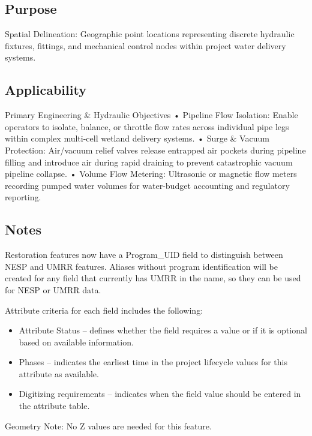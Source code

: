 \documentclass[
  letterpaper,
  DIV=11,
  numbers=noendperiod]{scrreprt}
\providecommand{\tightlist}{%
  \setlength{\itemsep}{0pt}\setlength{\parskip}{0pt}}
\begin{document}
\subsection{Purpose}\label{purpose-28}

Spatial Delineation: Geographic point locations representing discrete
hydraulic fixtures, fittings, and mechanical control nodes within
project water delivery systems.

\subsection{Applicability}\label{applicability-25}

Primary Engineering \& Hydraulic Objectives • Pipeline Flow Isolation:
Enable operators to isolate, balance, or throttle flow rates across
individual pipe legs within complex multi-cell wetland delivery systems.
• Surge \& Vacuum Protection: Air/vacuum relief valves release entrapped
air pockets during pipeline filling and introduce air during rapid
draining to prevent catastrophic vacuum pipeline collapse. • Volume Flow
Metering: Ultrasonic or magnetic flow meters recording pumped water
volumes for water-budget accounting and regulatory reporting.

\subsection{Notes}\label{notes-28}

Restoration features now have a Program\_UID field to distinguish
between NESP and UMRR features. Aliases without program identification
will be created for any field that currently has UMRR in the name, so
they can be used for NESP or UMRR data.

Attribute criteria for each field includes the following:

\begin{itemize}
\tightlist
\item
  Attribute Status -- defines whether the field requires a value or if
  it is optional based on available information.
\item
  Phases -- indicates the earliest time in the project lifecycle values
  for this attribute as available.
\item
  Digitizing requirements -- indicates when the field value should be
  entered in the attribute table.
\end{itemize}

Geometry Note: No Z values are needed for this feature.
\end{document}
